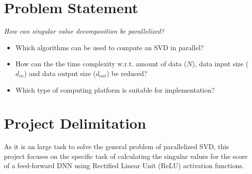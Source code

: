 \section{Problem Statement}

\textit{How can singular value decomposition be parallelized?}

\begin{itemize}
\item Which algorithms can be used to compute an SVD in parallel?
\item How can the the time complexity w.r.t. amount of data ($N$), data input size ($d_{in}$) and data output size ($d_{out}$) be reduced?
\item Which type of computing platform is suitable for implementation?
\end{itemize}

\section{Project Delimitation}

As it is an large task to solve the general problem of parallelized SVD, this project focuses on the specific task of calculating the singular values for the score of a feed-forward DNN using Rectified Linear Unit (ReLU) activation functions.